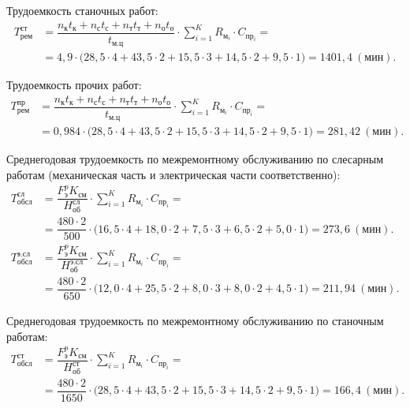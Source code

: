 \vspace{-3mm}
Трудоемкость станочных работ:
{\small
\begin{align*}
  T^{\text{ст}}_{\text{рем}} &= 
  \dfrac{
    n_{\text{к}}t_{\text{к}} + n_{\text{с}}t_{\text{с}} +
    n_{\text{т}}t_{\text{т}} + n_{\text{о}}t_{\text{о}}
  }{
    t_{\text{м.ц}}
  } \cdot \sum^K_{i=1} R_{\text{м}_i} \cdot C_{\text{пр}_i} = \\
  &= 4{,}9
    \cdot
    \big(
      28{,}5 \cdot 4 + 43{,}5 \cdot 2 + 15{,}5 \cdot 3 + 
      14{,}5 \cdot 2 + 9{,}5 \cdot 1
    \big) =
    1401{,}4 \: (\text{мин}).
\end{align*}
}

\vspace{-3mm}
Трудоемкость прочих работ:
{\small
\begin{align*}
  T^{\text{пр}}_{\text{рем}} &= 
  \dfrac{
    n_{\text{к}}t_{\text{к}} + n_{\text{с}}t_{\text{с}} +
    n_{\text{т}}t_{\text{т}} + n_{\text{о}}t_{\text{о}}
  }{
    t_{\text{м.ц}}
  } \cdot \sum^K_{i=1} R_{\text{м}_i} \cdot C_{\text{пр}_i} = \\
  &= 0{,}984
    \cdot
    \big(
      28{,}5 \cdot 4 + 43{,}5 \cdot 2 + 15{,}5 \cdot 3 + 
      14{,}5 \cdot 2 + 9{,}5 \cdot 1
    \big) =
    281{,}42 \: (\text{мин}).
\end{align*}
}

\vspace{-3mm}
Среднегодовая трудоемкость по межремонтному обслуживанию 
по слесарным работам (механическая часть и электрическая части соответственно):
{\small
\begin{align*}
  T^{\text{сл}}_{\text{обсл}} &= 
  \dfrac{
    F^p_{\text{э}} K_{см}
  }{
    H^{\text{сл}}_{\text{об}}
  } \cdot \sum^K_{i=1} R_{\text{м}_i} \cdot C_{\text{пр}_i} = \\
  &= \dfrac{480 \cdot 2}{500}
    \cdot
    \big(
      16{,}5 \cdot 4 + 18{,}0 \cdot 2 + 7{,}5 \cdot 3 + 
      6{,}5 \cdot 2 + 5{,}0 \cdot 1
    \big) =
    273{,}6 \: (\text{мин}).
  \\
  T^{\text{э.сл}}_{\text{обсл}} &= 
  \dfrac{
    F^p_{\text{э}} K_{см}
  }{
    H^{\text{э.сл}}_{\text{об}}
  } \cdot \sum^K_{i=1} R_{\text{м}_i} \cdot C_{\text{пр}_i} = \\
  &= \dfrac{480 \cdot 2}{650}
    \cdot
    \big(
      12{,}0 \cdot 4 + 25{,}5 \cdot 2 + 8{,}0 \cdot 3 + 
      8{,}0 \cdot 2 + 4{,}5 \cdot 1
    \big) =
    211{,}94 \: (\text{мин}).
\end{align*}
}

\vspace{-3mm}
Среднегодовая трудоемкость по межремонтному обслуживанию по
станочным работам:
{\small
\begin{align*}
  T^{\text{ст}}_{\text{обсл}} &= 
  \dfrac{
    F^p_{\text{э}} K_{см}
  }{
    H^{\text{ст}}_{\text{об}}
  } \cdot \sum^K_{i=1} R_{\text{м}_i} \cdot C_{\text{пр}_i} = \\
  &= \dfrac{480 \cdot 2}{1650}
    \cdot
    \big(
      28{,}5 \cdot 4 + 43{,}5 \cdot 2 + 15{,}5 \cdot 3 + 
      14{,}5 \cdot 2 + 9{,}5 \cdot 1
    \big) =
    166{,}4 \: (\text{мин}).
\end{align*}
}


